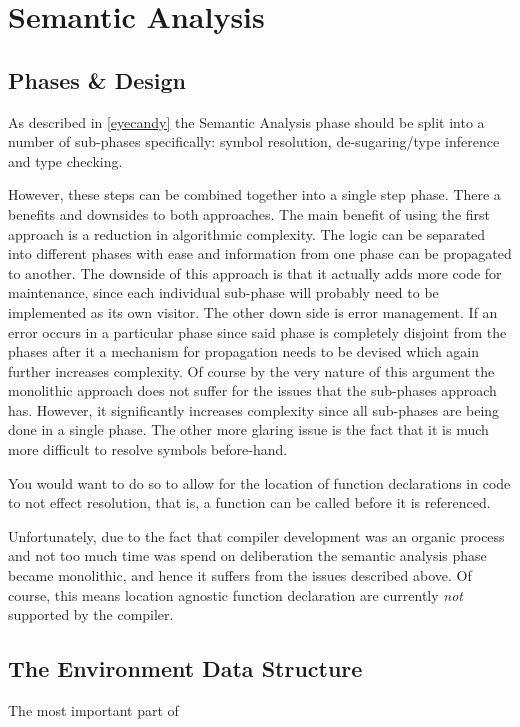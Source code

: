 \section{Semantic Analysis}

\subsection{Phases \& Design}

As described in \ref{eyecandy} the Semantic Analysis phase
should be split into a number of sub-phases specifically: symbol
resolution, de-sugaring/type inference and type checking.

However, these steps can be combined together into a single step
phase. There a benefits and downsides to both approaches. The
main benefit of using the first approach is a reduction in
algorithmic complexity. The logic can be separated into
different phases with ease and information from one phase can be
propagated to another. The downside of this approach is that it
actually adds more code for maintenance, since each individual
sub-phase will probably need to be implemented as its own
visitor. The other down side is error management. If an error
occurs in a particular phase since said phase is completely
disjoint from the phases after it a mechanism for propagation
needs to be devised which again further increases complexity. Of
course by the very nature of this argument the monolithic
approach does not suffer for the issues that the sub-phases
approach has. However, it significantly increases complexity
since all sub-phases are being done in a single phase. The other
more glaring issue is the fact that it is much more difficult to
resolve symbols before-hand.

You would want to do so to allow for the location of function
declarations in code to not effect resolution, that is, a
function can be called before it is referenced.

Unfortunately, due to the fact that compiler development was an
organic process and not too much time was spend on deliberation
the semantic analysis phase became monolithic, and hence it
suffers from the issues described above. Of course, this means
location agnostic function declaration are currently \emph{not}
supported by the compiler.

\subsection{The Environment Data Structure}

The most important part of
